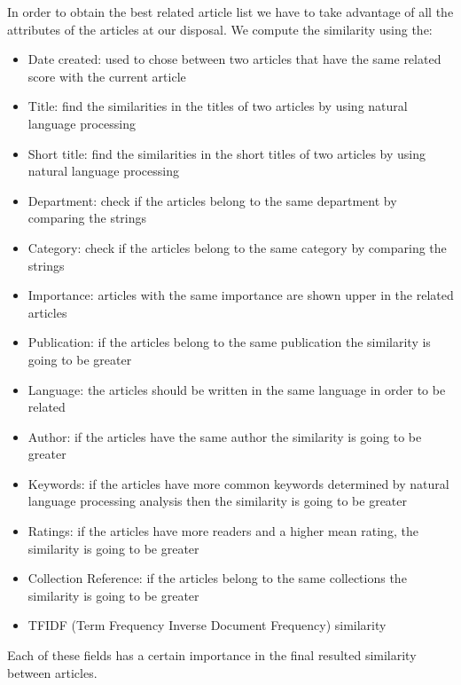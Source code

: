 In order to obtain the best related article list we have to take advantage of all the attributes of the articles at our disposal.
We compute the similarity using the:
\begin{itemize}
	\item Date created: used to chose between two articles that have the same related score with the current article
	\item Title: find the similarities in the titles of two articles by using natural language processing
	\item Short title: find the similarities in the short titles of two articles by using natural language processing
	\item Department: check if the articles belong to the same department by comparing the strings
	\item Category: check if the articles belong to the same category by comparing the strings
	\item Importance: articles with the same importance are shown upper in the related articles
	\item Publication: if the articles belong to the same publication the similarity is going to be greater
	\item Language: the articles should be written in the same language in order to be related
	\item Author: if the articles have the same author the similarity is going to be greater
	\item Keywords: if the articles have more common keywords determined by natural language processing analysis then the similarity is going to be greater
	\item Ratings: if the articles have more readers and a higher mean rating, the similarity is going to be greater
	\item Collection Reference: if the articles belong to the same collections the similarity is going to be greater
	\item TFIDF (Term Frequency Inverse Document Frequency) similarity
\end{itemize}
Each of these fields has a certain importance in the final resulted similarity between articles.

